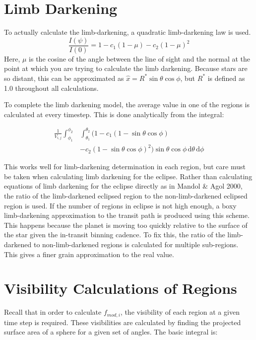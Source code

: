 \documentclass[iop]{emulateapj}
\newcommand{\fmod}{\mbox{$f_{mod,i}$}}
\begin{document}
\section{Limb Darkening}
To actually calculate the limb-darkening, a quadratic limb-darkening law is used.
\begin{equation}
   \frac{I(\psi)}{I(0)} = 1 - c_1 (1 - \mu) - c_2 (1 - \mu)^2
\end{equation}
Here, $\mu$ is the cosine of the angle between the line of sight and the normal at the point at which you are trying to calculate the limb darkening. Because stars are so distant, this can be approximated as $\hat{x} = R^* \sin{\theta}\cos{\phi}$, but $R^{*}$ is defined as 1.0 throughout all calculations.

To complete the limb darkening model, the average value in one of the regions is calculated at every timestep. This is done analytically from the integral:

\begin{equation}
\begin{split}
    \frac{1}{V_{i,j}} \int_{\phi_1}^{\phi_2} & \int_{\theta_1}^{\theta_2}  (1 - c_1 (1 - \sin{\theta}\cos{\phi}) \\ &- c_2 (1 - \sin{\theta}\cos{\phi})^2) \sin{\theta}\cos{\phi}\,\mathrm{d}\theta \, \mathrm{d}\phi
\end{split}
\end{equation}

This works well for limb-darkening determination in each region, but care must be taken when calculating limb darkening for the eclipse. Rather than calculating equations of limb darkening for the eclipse directly as in Mandol \& Agol 2000, the ratio of the limb-darkened eclipsed region to the non-limb-darkened eclipsed region is used. If the number of regions in eclipse is not high enough, a boxy limb-darkening approximation to the transit path is produced using this scheme. This happens because the planet is moving too quickly relative to the surface of the star given the in-transit binning cadence. To fix this, the ratio of the limb-darkened to non-limb-darkened regions is calculated for multiple sub-regions. This gives a finer grain approximation to the real value.

\section{Visibility Calculations of Regions \label{vis}}
Recall that in order to calculate \fmod, the visibility of each region at a given time step is required. These visibilities are calculated by finding the projected surface area of a sphere for a given set of angles. The basic integral is:
\end{document}
